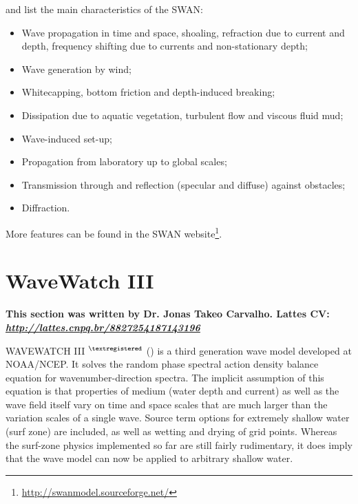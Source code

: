 \noindent \textcite{Dasilva2013} and \textcite{Booij1999,Booij1996} list the main characteristics of the SWAN:
\bigskip

\begin{itemize}
\item Wave propagation in time and space, shoaling, refraction due to current and depth, frequency shifting due to currents and non-stationary depth;
\item Wave generation by wind;
\item Whitecapping, bottom friction and depth-induced breaking;
\item Dissipation due to aquatic vegetation, turbulent flow and viscous fluid mud;
\item Wave-induced set-up;
\item Propagation from laboratory up to global scales;
\item Transmission through and reflection (specular and diffuse) against obstacles;
\item Diffraction.
\end{itemize}
\bigskip

More features can be found in the SWAN website\textcolor{bleu_cite}{\textit{}\footnote{\textcolor{bleu_cite}{\href{http://swanmodel.sourceforge.net/}{http://swanmodel.sourceforge.net/}}}}.



\section{WaveWatch III}\label{ww3secao}
\bigskip

\noindent \textbf{This section was written by Dr. Jonas Takeo Carvalho.  \newline Lattes CV: \textit{\textcolor{bleu_cite}{\href{http://lattes.cnpq.br/8827254187143196}{http://lattes.cnpq.br/8827254187143196}}}} 
\bigskip

\noindent WAVEWATCH III $^{\tiny{\textregistered}}$ (\cite{Tolman1997,Tolman1999,Tolman2009,Tolman2014,WW32016}) is a third generation wave model developed at NOAA/NCEP.  
It solves the random phase spectral action density balance equation for wavenumber-direction spectra. The implicit assumption of this equation is that 
properties of medium (water depth and current) as well as the wave field itself vary on time and space scales that are much larger than the variation 
scales of a single wave. Source term options for extremely shallow water (surf zone) are included, as well as wetting and drying of grid points. 
Whereas the surf-zone physics implemented so far are still fairly rudimentary, it does imply that the wave model can now be applied to arbitrary
shallow water. 
\bigskip

